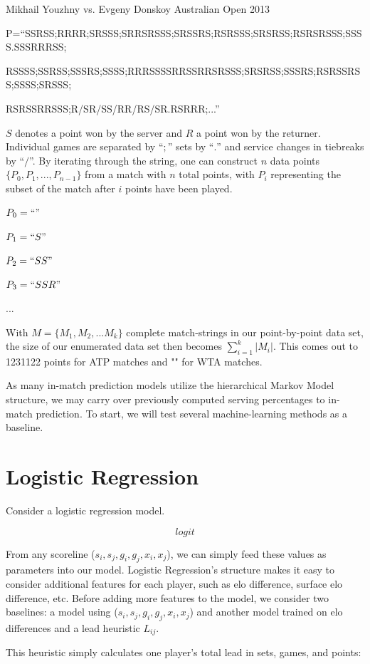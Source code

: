\documentclass[chapterprefix=false]{report}
\begin{document}
Mikhail Youzhny vs. Evgeny Donskoy Australian Open 2013

P=``SSRSS;RRRR;SRSSS;SRRSRSSS;SRSSRS;RSRSSS;SRSRSS;RSRSRSSS;SSSS.SSSRRRSS;

RSSSS;SSRSS;SSSRS;SSSS;RRRSSSSRRSSRRSRSSS;SRSRSS;SSSRS;RSRSSRSS;SSSS;SRSSS;

RSRSSRRSSS;R/SR/SS/RR/RS/SR.RSRRR;...''

$S$ denotes a point won by the server and $R$ a point won by the returner. Individual games are separated by ``$;$'' sets by ``$.$'' and service changes in tiebreaks by ``$/$''. By iterating through the string, one can construct $n$ data points $\{P_0,P_1,...,P_{n-1}\}$ from a match with $n$ total points, with $P_i$ representing the subset of the match after $i$ points have been played.

$P_0 = ``"$

$P_1 = ``S"$

$P_2 = ``SS"$

$P_3 = ``SSR"$

...

With $M = \{M_1,M_2,...M_k\}$ complete match-strings in our point-by-point data set, the size of our enumerated data set then becomes $\sum_{i=1}^k |M_i|$. This comes out to 1231122 points for ATP matches and "" for WTA matches.

As many in-match prediction models utilize the hierarchical Markov Model structure, we may carry over previously computed serving percentages to in-match prediction. To start, we will test several machine-learning methods as a baseline.

\section{Logistic Regression}

Consider a logistic regression model.

$$logit$$

From any scoreline  ($s_i,s_j,g_i,g_j,{x}_i,{x}_j$), we can simply feed these values as parameters into our model. Logistic Regression's structure makes it easy to consider additional features for each player, such as elo difference, surface elo difference, etc. Before adding more features to the model, we consider two baselines: a model using ($s_i,s_j,g_i,g_j,{x}_i,{x}_j$) and another model trained on elo differences and a lead heuristic $L_{ij}$.

This heuristic simply calculates one player's total lead in sets, games, and points:
\end{document}

